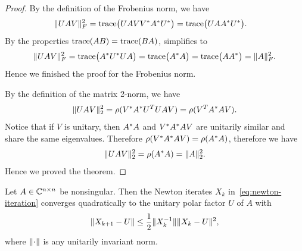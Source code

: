 \documentclass[12pt]{article}
\begin{document}
\begin{proof}
By the definition of the Frobenius norm, we have 
\begin{equation}
    \label{eq:thm2-2-proof1}
    \begin{aligned}
        \|UAV\|_F^2 &= \mathrm{trace}\big(U AVV^* A^* U^* \big) = \mathrm{trace}\big( U AA^* U^*\big).
    \end{aligned}
\end{equation}
By the properties $\mathrm{trace}(AB) = \mathrm{trace}(BA)$,  simplifies to 
\begin{equation}
    \label{eq:thm2-2-proof2}
    \|U AV\|_F^2 = \mathrm{trace}\big(A^* U^* U A\big) = \mathrm{trace}\big(A^* A\big) = \mathrm{trace}\big(AA^*\big) = \|A\|_F^2.
\end{equation}
Hence we finished the proof for the Frobenius norm.

By the definition of the matrix 2-norm, we have 
\begin{equation}\notag
    \|{UAV}\|_2^2 = \rho(V^* A^* U^T UAV) = \rho({V^T A^* AV}).
\end{equation}
Notice that if $V$ is unitary, then $A^* A$ and $V^* A^* A V$ are unitarily similar and share the same eigenvalues. Therefore $\rho(V^* A^* AV) = \rho (A^* A)$, therefore we have 
\begin{equation}\notag
    \|{UAV}\|_2^2 = \rho(A^* A) = \|{A}\|_2^2.
\end{equation}
Hence we proved the theorem.
\end{proof}

\begin{theorem}
     \label{thm:newton-converge}
    Let $A\in\mathbb{C}^{n\times n}$ be nonsingular. Then the Newton iterates $X_k$ in~\eqref{eq:newton-iteration} converges quadratically to the unitary polar factor $U$ of $A$ with 
    \begin{equation}\notag
        \|{X_{k+1} - U}\| \leq \frac 12 \|{X_k^{-1}}\|\|{X_k - U}\|^2,
    \end{equation}
    where $\|{\cdot}\|$ is any unitarily invariant norm.
\end{theorem}
\end{document}
